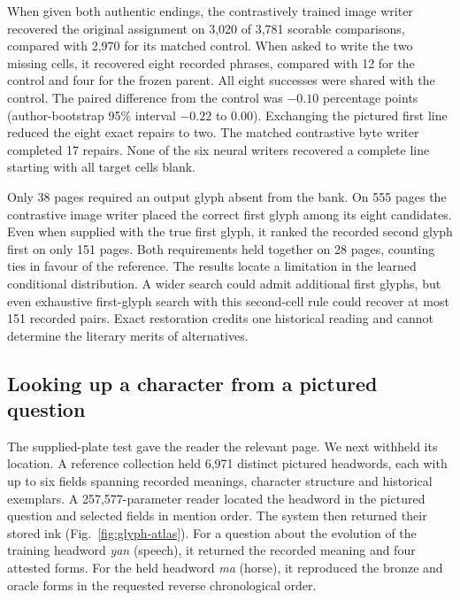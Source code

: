 \documentclass[12pt,a4paper]{article}
\providecommand{\DIFadd}[1]{{\protect\color{blue} \sf #1}} %
\begin{document}
\DIFadd{When given both authentic endings, the contrastively trained image writer recovered the original assignment on 3,020 of 3,781 scorable comparisons, compared with 2,970 for its matched control. When asked to write the two missing cells, it recovered eight recorded phrases, compared with 12 for the control and four for the frozen parent. All eight successes were shared with the control. The paired difference from the control was $-0.10$ percentage points (author-bootstrap 95\% interval $-0.22$ to $0.00$). Exchanging the pictured first line reduced the eight exact repairs to two. The matched contrastive byte writer completed 17 repairs. None of the six neural writers recovered a complete line starting with all target cells blank.
}

\DIFadd{Only 38 pages required an output glyph absent from the bank. On 555 pages the contrastive image writer placed the correct first glyph among its eight candidates. Even when supplied with the true first glyph, it ranked the recorded second glyph first on only 151 pages. Both requirements held together on 28 pages, counting ties in favour of the reference. The results locate a limitation in the learned conditional distribution. A wider search could admit additional first glyphs, but even exhaustive first-glyph search with this second-cell rule could recover at most 151 recorded pairs. Exact restoration credits one historical reading and cannot determine the literary merits of alternatives.
}


\subsection*{\DIFadd{Looking up a character from a pictured question}}
\DIFadd{The supplied-plate test gave the reader the relevant page. We next withheld its location. A reference collection held 6,971 distinct pictured headwords, each with up to six fields spanning recorded meanings, character structure and historical exemplars. A 257,577-parameter reader located the headword in the pictured question and selected fields in mention order. The system then returned their stored ink (Fig.~\ref{fig:glyph-atlas}). For a question about the evolution of the training headword \textit{yan} (speech), it returned the recorded meaning and four attested forms. For the held headword \textit{ma} (horse), it reproduced the bronze and oracle forms in the requested reverse chronological order.
}
\end{document}
